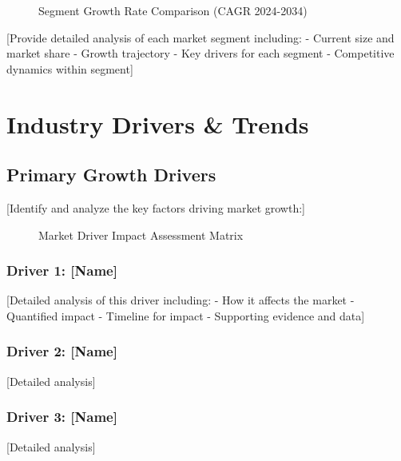 \documentclass[11pt,letterpaper]{report}
\begin{document}

\begin{figure}[htbp]
\centering
\caption{Segment Growth Rate Comparison (CAGR 2024-2034)}
\label{fig:segment_growth}
\end{figure}

[Provide detailed analysis of each market segment including:
- Current size and market share
- Growth trajectory
- Key drivers for each segment
- Competitive dynamics within segment]

\chapter{Industry Drivers \& Trends}

\section{Primary Growth Drivers}

[Identify and analyze the key factors driving market growth:]


\begin{figure}[htbp]
\centering
\caption{Market Driver Impact Assessment Matrix}
\label{fig:driver_matrix}
\end{figure}

\subsection{Driver 1: [Name]}
[Detailed analysis of this driver including:
- How it affects the market
- Quantified impact
- Timeline for impact
- Supporting evidence and data]

\subsection{Driver 2: [Name]}
[Detailed analysis]

\subsection{Driver 3: [Name]}
[Detailed analysis]
\end{document}
